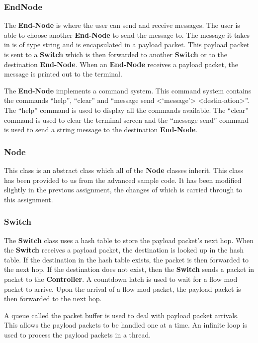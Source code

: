 \documentclass{article}
\begin{document}
\subsubsection{EndNode}
The \textbf{End-Node} is where the user can send and receive messages. The user
is able to choose another \textbf{End-Node} to send the message to. The message
it takes in is of type string and is encapsulated in a payload packet. This
payload packet is sent to a \textbf{Switch} which is then forwarded to another
\textbf{Switch} or to the destination \textbf{End-Node}. When an \textbf{End-Node}
receives a payload packet, the message is printed out to the terminal.

The \textbf{End-Node} implements a command system. This command system contains
the commands ``help'', ``clear'' and ``message send
\textless`message'\textgreater
\textless{}destin-\newline{}ation\textgreater{}''. The ``help'' command is used
to display all the commands available. The ``clear'' command is used to clear the
terminal screen and the ``message send'' command is used to send a string
message to the destination \textbf{End-Node}.

\subsubsection{Node}
This class is an abstract class which all of the \textbf{Node} classes inherit.
This class has been provided to us from the advanced sample code. It has been
modified slightly in the previous assignment, the changes of which is carried
through to this assignment.

\subsubsection{Switch}
The \textbf{Switch} class uses a hash table to store the payload packet's next
hop. When the \textbf{Switch} receives a payload packet, the destination is
looked up in the hash table. If the destination in the hash table exists, the
packet is then forwarded to the next hop. If the destination does not exist,
then the \textbf{Switch} sends a packet in packet to the \textbf{Controller}.
A countdown latch is used to wait for a flow mod packet to arrive. Upon the
arrival of a flow mod packet, the payload packet is then forwarded to the
next hop.

A queue called the packet buffer is used to deal with payload packet arrivals.
This allows the payload packets to be handled one at a time.  An infinite loop
is used to process the payload packets in a thread.
\end{document}
